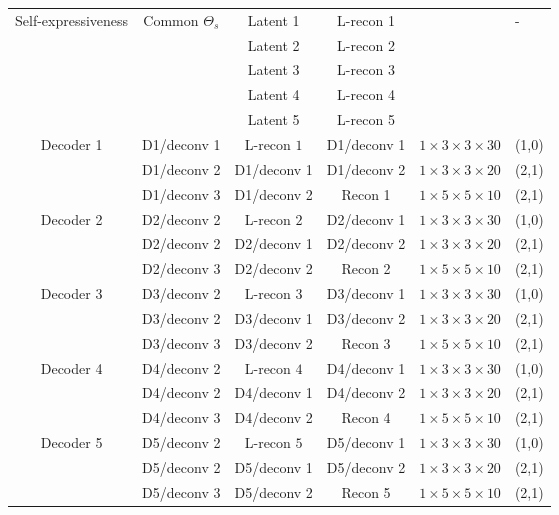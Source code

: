\documentclass[journal]{IEEEtran}
\begin{document}
\begin{table}[htp!]
{\begin{tabular}{|c|c|c|c|l|  p{0.7cm}|}
			
			\multirow{5}{*}{Self-expressiveness}  & \multirow{5}{*}{Common $\Theta_s$} &  Latent 1   & L-recon 1  & \centering \multirow{5}{*}{$5914624$ Parameters} & \multirow{5}{*}{-} \\
			\multirow{5}{*}{layer}&   &  Latent 2 &  L-recon 2  &    &   \\
			&   &  Latent 3 &  L-recon 3  &    &   \\
			&   &  Latent 4 &  L-recon 4  &    &   \\
			&   &  Latent 5 &  L-recon 5  &    &   \\	
\hline\hline	
			\multirow{3}{*}{Decoder 1}  & D1/deconv 1 &  L-recon $1$  & D1/deconv 1  & $1\times3\times3\times30$  & (1,0) \\
			&    D1/deconv 2 &  D1/deconv 1  & D1/deconv 2  &  $1\times3\times3\times20$ & (2,1) \\			
			&    D1/deconv 3 &  D1/deconv 2  & Recon 1  &  $1\times5\times5\times10$ & (2,1) \\	
			\hline\hline
			\multirow{3}{*}{Decoder 2}  & D2/deconv 2 &  L-recon $2$  & D2/deconv 1  & $1\times3\times3\times30$  & (1,0) \\
			&    D2/deconv 2 &  D2/deconv 1  & D2/deconv 2  &  $1\times3\times3\times20$ & (2,1) \\			
			&    D2/deconv 3 &  D2/deconv 2  & Recon 2  &  $1\times5\times5\times10$ & (2,1) \\	
			\hline\hline
			\multirow{3}{*}{Decoder 3}  & D3/deconv 2 &  L-recon $3$  & D3/deconv 1  & $1\times3\times3\times30$  & (1,0) \\
			&    D3/deconv 2 &  D3/deconv 1  & D3/deconv 2  &  $1\times3\times3\times20$ & (2,1) \\			
			&    D3/deconv 3 &  D3/deconv 2  & Recon 3  &  $1\times5\times5\times10$ & (2,1) \\	
			\hline\hline
			\multirow{3}{*}{Decoder 4}  & D4/deconv 2 &  L-recon $4$  & D4/deconv 1  & $1\times3\times3\times30$  & (1,0) \\
			&    D4/deconv 2 &  D4/deconv 1  & D4/deconv 2  &  $1\times3\times3\times20$ & (2,1) \\			
			&    D4/deconv 3 &  D4/deconv 2  & Recon 4 &  $1\times5\times5\times10$ & (2,1) \\	
			\hline\hline
			\multirow{3}{*}{Decoder 5}  & D5/deconv 2 &  L-recon $5$  & D5/deconv 1  & $1\times3\times3\times30$  & (1,0) \\
			&    D5/deconv 2 &  D5/deconv 1  & D5/deconv 2  &  $1\times3\times3\times20$ & (2,1) \\			
			&    D5/deconv 3 &  D5/deconv 2  & Recon 5 &  $1\times5\times5\times10$ & (2,1) \\	
			\hline
			
		\end{tabular} 
	}
\end{table}
\end{document}
